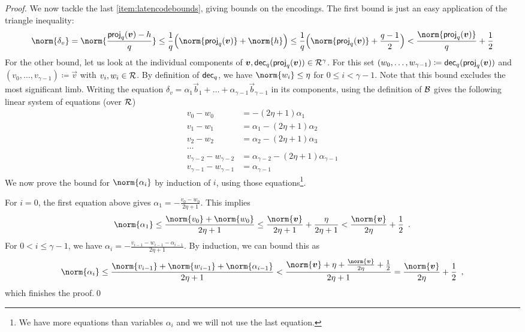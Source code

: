 \begin{proof}
\bigskip\noindent
We now tackle the last \autoref{item:latencodebounds}, giving bounds on the encodings.
The first bound is just an easy application of the triangle inequality:
\[
 \norm{\delta_v} = \norm{ \frac{\proj_q(\vec{v}) - h}{q}} \leq \frac{1}{q} \Bigl( \norm{\proj_q(\vec{v})} + \norm{h}\Bigr)
 \leq \frac{1}{q}\Bigl(\norm{\proj_q(\vec{v})} + \frac{q-1}{2}\Bigr)
 < \frac{\norm{\proj_q(\vec{v})}}{q} + \frac{1}{2}
\]
For the other bound, let us look at the individual components of $\boldsymbol{v}, \mathsf{dec}_q(\mathsf{proj}_q(\boldsymbol{v})) \in\mathcal{R}^\gamma$.
For this set $(w_0,\ldots, w_{\gamma-1})  \coloneqq \mathsf{dec}_q(\mathsf{proj}_q(\boldsymbol{v}))$ and 
$(v_0,\ldots,v_{\gamma-1}) \coloneqq \vec{v}$ with $v_i,w_i\in\mathcal{R}$.
By definition of $\mathsf{dec}_q$, we have $\norm{w_i}\leq \eta$ for $0\leq i < \gamma-1$.
Note that this bound excludes the most significant limb.
Writing the equation $\delta_v = \alpha_1\vec{b}_1 + \ldots + \alpha_{\gamma-1}\vec{b}_{\gamma-1}$ in its components, using the definition of $\mathcal{B}$ gives the following linear system of equations (over $\mathcal{R}$)
\begin{align*}
v_0 - w_0 &= -(2\eta+1)\alpha_1\\
v_1 - w_1 &= \alpha_1 - (2\eta+1)\alpha_2\\
v_2 - w_2 &= \alpha_2 - (2\eta+1)\alpha_3\\
\ldots\\
v_{\gamma-2} - w_{\gamma-2} &= \alpha_{\gamma-2} - (2\eta+1)\alpha_{\gamma-1}\\
v_{\gamma-1} - w_{\gamma-1} &= \alpha_{\gamma-1}
\end{align*}
We now prove the bound for $\norm{\alpha_i}$ by induction of $i$, using those equations\footnote{We have more equations than variables $\alpha_i$ and we will not use the last equation.}.

\smallskip\noindent
For $i=0$, the first equation above gives $\alpha_1 = -\frac{v_0-w_0}{2\eta+1}$. This implies
\[
  \norm{\alpha_1} \leq \frac{\norm{v_0} + \norm{w_0}}{2\eta+1} \leq \frac{\norm{\vec{v}}}{2\eta+1} + \frac{\eta}{2\eta+1} < \frac{\norm{\vec{v}}}{2\eta} + \frac12\enspace.
\]
For $0<i\leq \gamma-1$, we have $\alpha_i = -\frac{v_{i-1}-w_{i-1} - \alpha_{i-1}}{2\eta+1}$. By induction, we can bound this as
\[
 \norm{\alpha_i} 
 \leq \frac{ \norm{v_{i-1}} + \norm{w_{i-1}} + \norm{\alpha_{i-1}} } {2\eta+1}
 < \frac{ \norm{\vec{v}} + \eta + \frac{\norm{\vec{v}}}{2\eta} + \frac{1}{2} }{2\eta+1} = \frac{\norm{\vec{v}}}{2\eta} + \frac{1}{2}\enspace,
\]
which finishes the proof.\qed
\end{proof}

